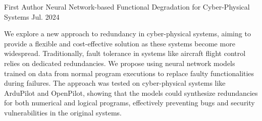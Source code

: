 

\begin{cventries}

  \cventry
    {First Author} %
    {Neural Network-based Functional Degradation for Cyber-Physical Systems} %
    {} %
    {Jul. 2024} %
    {
      We explore a new approach to redundancy in cyber-physical systems, aiming to provide a flexible and cost-effective solution as these systems become more widespread. Traditionally, fault tolerance in systems like aircraft flight control relies on dedicated redundancies. We propose using neural network models trained on data from normal program executions to replace faulty functionalities during failures. The approach was tested on cyber-physical systems like ArduPilot and OpenPilot, showing that the models could synthesize redundancies for both numerical and logical programs, effectively preventing bugs and security vulnerabilities in the original systems.
      \begin{cvitems} %
      \end{cvitems}
    }

\end{cventries}
